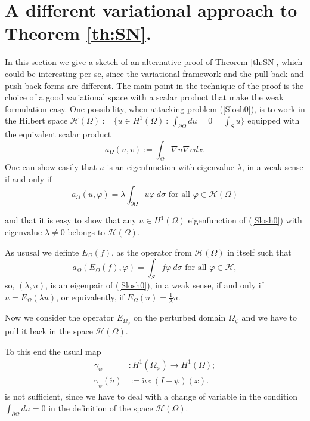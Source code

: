 \documentclass[a4paper,reqno,11pt,oneside]{amsart}
\theoremstyle{plain}
\theoremstyle{plain}
\theoremstyle{plain}
\theoremstyle{remark}
\begin{document}
\appendix

\section{A different variational approach to Theorem  \ref{th:SN}.}\label{Sec:frame-bis}
In this section we give a sketch of an alternative proof of Theorem  \ref{th:SN}, 
which could be interesting per se, since the variational framework and the pull back and push back forms are different.
The main point in the technique of the proof is the choice of a good variational space with a scalar product that make the weak formulation easy.
One possibility, when attacking problem (\ref{Slosh0}), is to work in the Hilbert space $\mathcal{H}(\Omega):=\{u\in H^1(\Omega)\ :\ \int_{\partial \Omega}du=0=\int_S u \}$ equipped with the equivalent scalar product
$$a_\Omega(u,v):=\int_\Omega \nabla u \nabla v dx.$$
One can show easily that $u$ is an eigenfunction with eigenvalue $\lambda$,   in a weak sense if and only if 
\begin{equation}\label{eq:weakSD}
    a_{\Omega}(u,\varphi)=\lambda\int_{\partial \Omega} u\varphi\ d\sigma  \text{ for all }\varphi\in \mathcal{H}(\Omega)
\end{equation}

and that it is easy to show that any $u\in H^1(\Omega)$ eigenfunction of  (\ref{Slosh0}) with eigenvalue $\lambda\neq0$  belongs to $ \mathcal{H}(\Omega)$.


As ususal we definte $E_\Omega (f)$, as the operator from  $ \mathcal{H}(\Omega)$ in itself such that
\begin{equation}
 a_\Omega(E_\Omega(f),\varphi)=\int_{S} f\varphi\  d\sigma 
\text{ for all }\varphi \in \mathcal{H},
\end{equation}
 so, $(\lambda, u)$, is an eigenpair of (\ref{Slosh0}), in a weak sense, if and only if $u=E_\Omega(\lambda u)$, or equivalently, if $E_\Omega (u)=\frac 1\lambda u$.   

Now we consider the operator $E_{\Omega_\psi}$ on the perturbed domain $\Omega_\psi$ and we have to pull it back in the space $\mathcal{H}(\Omega)$. 

To this end the usual map 
\begin{align*}
\gamma_\psi&:{H^1}(\Omega_{\psi})\rightarrow {H^1}(\Omega);\\
\gamma_\psi(\tilde{u})&:=\tilde u\circ (I+\psi)(x).
\end{align*}
is not sufficient, since we have to deal with a change of variable in the condition $\int_{\partial \Omega}du=0$ in the definition of the space $\mathcal{H}(\Omega)$.
\end{document}
